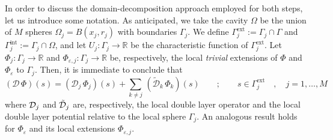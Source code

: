 In order to discuss the domain-decomposition approach employed for both steps, let us introduce some notation. As anticipated, we take the cavity $\Omega$ be the union of $M$ spheres $\Omega_j = B(x_j, r_j)$ with boundaries $\Gamma_j$. We define $\Gamma_j^\text{ext}:= \Gamma_j \cap \Gamma$ and $\Gamma_j^\text{int} := \Gamma_j \cap \Omega$, and let $U_j: \Gamma_j \to \mathbb{R}$ be the characteristic function of $\Gamma_j^\text{ext}$. Let $\Phi_j : \Gamma_j \to \mathbb{R}$ and $\Phi_{\varepsilon,j} : \Gamma_j \to \mathbb{R}$ be, respectively, the local \emph{trivial} extensions of $\Phi$ and $\Phi_\varepsilon$ to $\Gamma_j$.
Then, it is immediate to conclude that
\begin{equation}\label{eq:16}
(\mathcal{D} \, \Phi ) (s) = ( \mathcal{D}_j \, \Phi_j )(s) + \sum_{k \ne j} \,(\tilde{\mathcal{D}}_k \, \Phi_k )(s) \qquad ; \qquad s \in \Gamma_j^\text{ext} \quad, \quad  j = 1 , \ldots , M
\end{equation}
where $\mathcal{D}_j$ and $\tilde{\mathcal{D}}_j$ are, respectively, the local double layer operator and the local double layer potential relative to the local sphere $\Gamma_j$. An analogous result holds for $\Phi_\varepsilon$ and its local extensions $\Phi_{\varepsilon,j}$.  %

